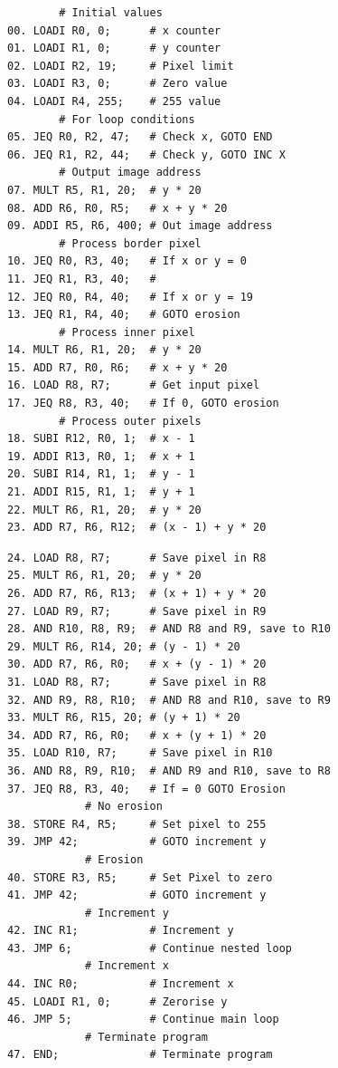 \documentclass[a4paper, english]{article}
\numberwithin{equation}{section}
\begin{document}
\begin{figure}[p]
    \label{lst:ass}
    \begin{minipage}{0.49\textwidth}
        \vspace{1.5em}
        \centering
        \begin{verbatim}
        # Initial values
00. LOADI R0, 0;      # x counter
01. LOADI R1, 0;      # y counter
02. LOADI R2, 19;     # Pixel limit
03. LOADI R3, 0;      # Zero value
04. LOADI R4, 255;    # 255 value
        # For loop conditions
05. JEQ R0, R2, 47;   # Check x, GOTO END
06. JEQ R1, R2, 44;   # Check y, GOTO INC X
        # Output image address
07. MULT R5, R1, 20;  # y * 20
08. ADD R6, R0, R5;   # x + y * 20
09. ADDI R5, R6, 400; # Out image address
        # Process border pixel
10. JEQ R0, R3, 40;   # If x or y = 0
11. JEQ R1, R3, 40;   #
12. JEQ R0, R4, 40;   # If x or y = 19
13. JEQ R1, R4, 40;   # GOTO erosion
        # Process inner pixel
14. MULT R6, R1, 20;  # y * 20
15. ADD R7, R0, R6;   # x + y * 20
16. LOAD R8, R7;      # Get input pixel
17. JEQ R8, R3, 40;   # If 0, GOTO erosion
        # Process outer pixels
18. SUBI R12, R0, 1;  # x - 1
19. ADDI R13, R0, 1;  # x + 1
20. SUBI R14, R1, 1;  # y - 1
21. ADDI R15, R1, 1;  # y + 1
22. MULT R6, R1, 20;  # y * 20
23. ADD R7, R6, R12;  # (x - 1) + y * 20
    \end{verbatim}
    \end{minipage}
    \begin{minipage}{0.49\textwidth}
        \vspace{.5em}
        \centering
        \begin{verbatim}
24. LOAD R8, R7;      # Save pixel in R8
25. MULT R6, R1, 20;  # y * 20
26. ADD R7, R6, R13;  # (x + 1) + y * 20
27. LOAD R9, R7;      # Save pixel in R9
28. AND R10, R8, R9;  # AND R8 and R9, save to R10
29. MULT R6, R14, 20; # (y - 1) * 20
30. ADD R7, R6, R0;   # x + (y - 1) * 20
31. LOAD R8, R7;      # Save pixel in R8
32. AND R9, R8, R10;  # AND R8 and R10, save to R9
33. MULT R6, R15, 20; # (y + 1) * 20
34. ADD R7, R6, R0;   # x + (y + 1) * 20
35. LOAD R10, R7;     # Save pixel in R10
36. AND R8, R9, R10;  # AND R9 and R10, save to R8
37. JEQ R8, R3, 40;   # If = 0 GOTO Erosion
            # No erosion
38. STORE R4, R5;     # Set pixel to 255
39. JMP 42;           # GOTO increment y
            # Erosion
40. STORE R3, R5;     # Set Pixel to zero
41. JMP 42;           # GOTO increment y
            # Increment y
42. INC R1;           # Increment y
43. JMP 6;            # Continue nested loop
            # Increment x
44. INC R0;           # Increment x
45. LOADI R1, 0;      # Zerorise y
46. JMP 5;            # Continue main loop
            # Terminate program
47. END;              # Terminate program
     \end{verbatim}
    \end{minipage}
\end{figure}
\end{document}
